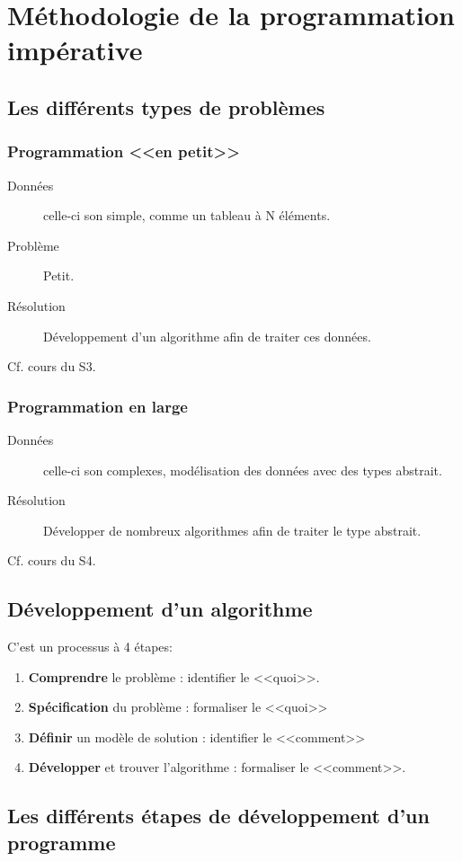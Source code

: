 	\chapter{Méthodologie de la programmation impérative}
	\section{Les différents types de problèmes}
		\subsection{Programmation <<en petit>>}
		\begin{description}
			\item[Données] celle-ci son simple, comme un tableau à N éléments.
			\item[Problème] Petit.
			\item[Résolution] Développement d'un algorithme afin de traiter ces données.
		\end{description}
		Cf. cours du S3.

		\subsection{Programmation en large}
		\begin{description}
			\item[Données] celle-ci son complexes, modélisation des données avec des types abstrait.
			\item[Résolution] Développer de nombreux algorithmes afin de traiter le type abstrait. 
		\end{description}
		Cf. cours du S4.
		\section{Développement d'un algorithme}
		C'est un processus à 4 étapes:
		\begin{enumerate}
			\item \textbf{Comprendre} le problème : identifier le <<quoi>>.
			\item \textbf{Spécification} du problème : formaliser le <<quoi>>
			\item \textbf{Définir} un modèle de solution : identifier le <<comment>>
			\item \textbf{Développer} et trouver l'algorithme : formaliser le <<comment>>.
		\end{enumerate}
		\newpage
	\section{Les différents étapes de développement d'un programme}
